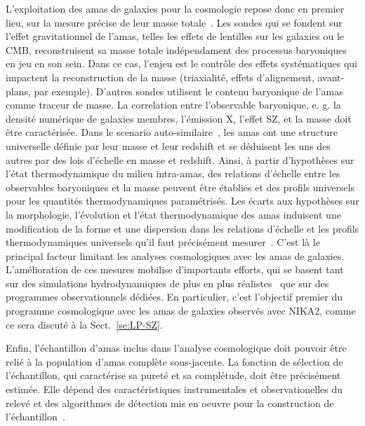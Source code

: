L'exploitation des amas de galaxies pour la cosmologie repose donc en
premier lieu, sur la mesure précise de leur masse
totale~\citep[voir \emph{e.g.}][pour une revue récente sur la mesure
de la masse des amas]{Pratt2019}. Les sondes qui se fondent sur l'effet
gravitationnel de l'amas, telles les effets
de lentilles sur les galaxies ou le CMB, reconstruisent sa masse
totale indépendament des processus baryoniques en jeu en son
sein. Dans ce cas, l'enjeu est le contrôle des effets systématiques qui
impactent la reconstruction de la masse (triaxialité, effets
d'alignement, avant-plans, par exemple). D'autres sondes utilisent le
contenu baryonique de l'amas comme traceur de masse. La correlation
entre l'observable baryonique, e. g. la densité numérique de galaxies
membres, l'émission X, l'effet SZ, et la masse doit être
caractérisée. Dans le scenario auto-similaire~\citep{Kaiser1986}, les
amas ont une structure universelle définie par leur masse et leur
redshift et se déduisent les uns des autres par des lois d'échelle en
masse et redshift. Ainsi, à partir d'hypothèses sur l'état
thermodynamique du milieu intra-amas, des relations d'échelle entre
les observables baryoniques et la masse peuvent être établies et des
profils universels pour les quantités thermodynamiques
paramétrisés. Les écarts aux hypothèses sur la morphologie,
l'évolution et l'état thermodynamique des amas induisent une
modification de la forme et une dispersion dans les relations
d'échelle et les profils thermodynamiques universels qu'il faut
précisément mesurer~\citep{NFW1996, Nagai2007, Arnaud2010}. C'est là le
principal facteur limitant les analyses cosmologiques avec les amas de
galaxies. L'amélioration de ces mesures mobilise d'importants efforts,
qui se basent tant sur des simulations hydrodynamiques de plus en plus
réalistes~\citep[comme exemple récent]{Henden2019} que sur des programmes
observationnels dédiées. 
En particulier, c'est l'objectif premier du programme cosmologique
avec les amas de galaxies observés avec NIKA2, comme ce sera discuté à
la Sect.~\ref{se:LP-SZ}.

Enfin, l'échantillon d'amas inclus dans l'analyse cosmologique doit
pouvoir être relié à la population d'amas complète sous-jacente. La
fonction de sélection de l'échantillon, qui caractérise sa pureté et
sa complétude, doit être précisément estimée. Elle dépend des
caractéristiques instrumentales et observationelles du relevé et des
algorithmes de détection mis en oeuvre pour la construction de
l'échantillon~\citep[par exemple]{Melin2005}. \\

